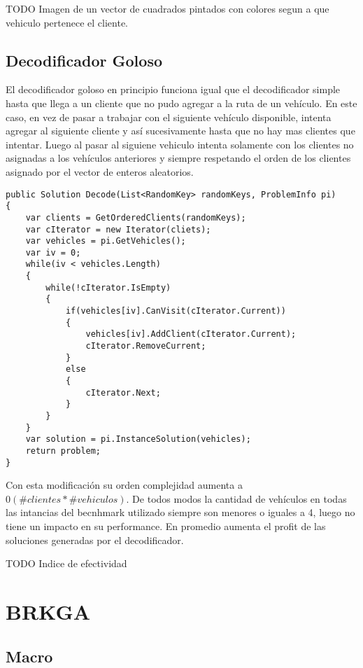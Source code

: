 \bigskip

TODO Imagen de un vector de cuadrados pintados con colores segun a que vehiculo pertenece el cliente.

\subsection{Decodificador Goloso}

El decodificador goloso en principio funciona igual que el decodificador simple hasta que llega a un cliente que no pudo agregar a la ruta de un vehículo. En este caso, en vez de pasar a trabajar con el siguiente vehículo disponible, intenta agregar al siguiente cliente y así sucesivamente hasta que no hay mas clientes que intentar. Luego al pasar al siguiene vehiculo intenta solamente con los clientes no asignadas a los vehículos anteriores y siempre respetando el orden de los clientes asignado por el vector de enteros aleatorios.

\bigskip

\begin{lstlisting} 
public Solution Decode(List<RandomKey> randomKeys, ProblemInfo pi)
{
	var clients = GetOrderedClients(randomKeys);
	var cIterator = new Iterator(cliets);
	var vehicles = pi.GetVehicles();	
	var iv = 0;
	while(iv < vehicles.Length)
	{
		while(!cIterator.IsEmpty)
		{
			if(vehicles[iv].CanVisit(cIterator.Current))
			{
				vehicles[iv].AddClient(cIterator.Current);
				cIterator.RemoveCurrent;
			}
			else
			{
				cIterator.Next;			
			}			
		}
	}
	var solution = pi.InstanceSolution(vehicles);
	return problem;
}
\end{lstlisting}

\bigskip

Con esta modificación su orden complejidad aumenta a $0(\#clientes * \#vehiculos)$. De todos modos la cantidad de vehículos en todas las intancias del becnhmark utilizado siempre son menores o iguales a 4, luego no tiene un impacto en su performance. En promedio aumenta el profit de las soluciones generadas por el decodificador.

\bigskip

TODO Indice de efectividad

\section{BRKGA}

\subsection{Macro}

